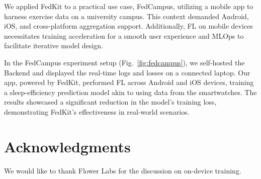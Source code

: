 \documentclass[letterpaper]{article} %
\begin{document}
We applied FedKit to a practical use case, FedCampus,
utilizing a mobile app to harness exercise data on a university campus.
This context demanded Android, iOS, and cross-platform aggregation support.
Additionally,
FL on mobile devices necessitates training acceleration for
a smooth user experience
and MLOps to facilitate iterative model design.

In the FedCampus experiment setup (Fig.~\ref{fig:fedcampus}),
we self-hosted the Backend
and displayed the real-time logs and losses on a connected laptop.
Our app, powered by FedKit,
performed FL across Android and iOS devices,
training a sleep-efficiency prediction model
akin to \cite{khoa2022fedmcrnn}
using data from the smartwatches.
The results showcased a significant reduction in the model's training loss,
demonstrating FedKit's effectiveness in real-world scenarios.

\appendix

\section*{Acknowledgments}
We would like to thank Flower Labs for the discussion on on-device training.

\bigskip


\end{document}

